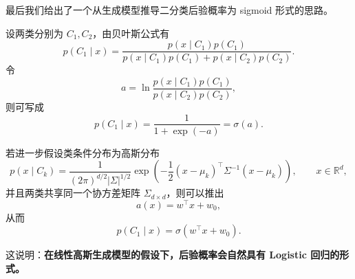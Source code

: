 最后我们给出了一个从生成模型推导二分类后验概率为 sigmoid 形式的思路。

设两类分别为 $C_1,C_2$，由贝叶斯公式有
\[
p(C_1\mid x)
=
\frac{p(x\mid C_1)p(C_1)}
{p(x\mid C_1)p(C_1)+p(x\mid C_2)p(C_2)}.
\]
令
\[
a
=
\ln \frac{p(x\mid C_1)p(C_1)}{p(x\mid C_2)p(C_2)},
\]
则可写成
\[
p(C_1\mid x)=\frac{1}{1+\exp(-a)}=\sigma(a).
\]

若进一步假设类条件分布为高斯分布
\[
p(x\mid C_k)
=
\frac{1}{(2\pi)^{d/2}|\Sigma|^{1/2}}
\exp\!\left(
-\frac{1}{2}(x-\mu_k)^{\top}\Sigma^{-1}(x-\mu_k)
\right),
\qquad x\in\mathbb{R}^d,
\]
并且两类共享同一个协方差矩阵 $\Sigma_{d\times d}$，则可以推出
\[
a(x)=w^{\top}x+w_0,
\]
从而
\[
p(C_1\mid x)=\sigma(w^{\top}x+w_0).
\]

这说明：\textbf{在线性高斯生成模型的假设下，后验概率会自然具有 Logistic 回归的形式。}